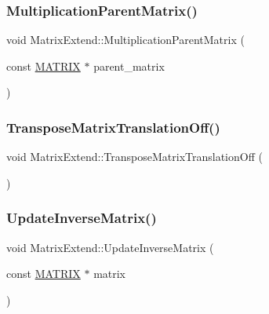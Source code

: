 \subsubsection{\texorpdfstring{Multiplication\+Parent\+Matrix()}{MultiplicationParentMatrix()}}
{\footnotesize\ttfamily void Matrix\+Extend\+::\+Multiplication\+Parent\+Matrix (\begin{DoxyParamCaption}\item[{const \mbox{\hyperlink{_vector3_d_8h_a032295cd9fb1b711757c90667278e744}{M\+A\+T\+R\+IX}} $\ast$}]{parent\+\_\+matrix }\end{DoxyParamCaption})\hspace{0.3cm}{\ttfamily [inline]}}

\mbox{\label{class_matrix_extend_ae567bb2d140dff892ed1b63f8de33ba9}} 
\subsubsection{\texorpdfstring{Transpose\+Matrix\+Translation\+Off()}{TransposeMatrixTranslationOff()}}
{\footnotesize\ttfamily void Matrix\+Extend\+::\+Transpose\+Matrix\+Translation\+Off (\begin{DoxyParamCaption}{ }\end{DoxyParamCaption})\hspace{0.3cm}{\ttfamily [inline]}}

\mbox{\label{class_matrix_extend_a5aa7bce55ed92acb79d21fda51e83146}} 
\subsubsection{\texorpdfstring{Update\+Inverse\+Matrix()}{UpdateInverseMatrix()}}
{\footnotesize\ttfamily void Matrix\+Extend\+::\+Update\+Inverse\+Matrix (\begin{DoxyParamCaption}\item[{const \mbox{\hyperlink{_vector3_d_8h_a032295cd9fb1b711757c90667278e744}{M\+A\+T\+R\+IX}} $\ast$}]{matrix }\end{DoxyParamCaption})\hspace{0.3cm}{\ttfamily [inline]}}

